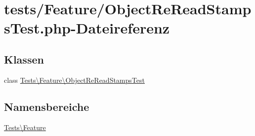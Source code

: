 \hypertarget{ObjectReReadStampsTest_8php}{}\section{tests/\+Feature/\+Object\+Re\+Read\+Stamps\+Test.php-\/\+Dateireferenz}
\label{ObjectReReadStampsTest_8php}
\subsection*{Klassen}
\begin{DoxyCompactItemize}
\item 
class \hyperlink{classTests_1_1Feature_1_1ObjectReReadStampsTest}{Tests\textbackslash{}\+Feature\textbackslash{}\+Object\+Re\+Read\+Stamps\+Test}
\end{DoxyCompactItemize}
\subsection*{Namensbereiche}
\begin{DoxyCompactItemize}
\item 
 \hyperlink{namespaceTests_1_1Feature}{Tests\textbackslash{}\+Feature}
\end{DoxyCompactItemize}
